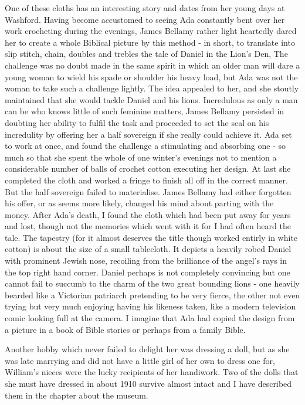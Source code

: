 One of these cloths has an interesting story and dates from her young days at Washford. Having become accustomed to seeing Ada constantly bent over her work crocheting during the evenings, James Bellamy rather light heartedly dared her to create a whole Biblical picture by this method - in short, to translate into slip stitch, chain, doubles and trebles the tale of Daniel in the Lion’s Den, The challenge was no doubt made in the same spirit in which an older man will dare a young woman to wield his spade or shoulder his heavy load, but Ada was not the woman to take such a challenge lightly. The idea appealed to her, and she stoutly maintained that she would tackle Daniel and his lions. Incredulous as only a man can be who knows little of such feminine matters, James Bellamy persisted in doubting her ability to fulfil the task and proceeded to set the seal on his incredulity by offering her a half sovereign if she really could achieve it. Ada set to work at once, and found the challenge a stimulating and absorbing one - so much so that she spent the whole of one winter's evenings not to mention a considerable number of balls of crochet cotton executing her design. At last she completed the cloth and worked a fringe to finish all off in the correct manner. But the half sovereign failed to materialise. James Bellamy had either forgotten his offer, or as seems more likely, changed his mind about parting with the money. After Ada's death, I found the cloth which had been put away for years and lost, though not the memories which went with it for I had often heard the tale. The tapestry (for it almost deserves the title though worked entirly in white cotton) is about the size of a small tablecloth. It depicts a heavily robed Daniel with prominent Jewish nose, recoiling from the brilliance of the angel's rays in the top right hand corner. Daniel perhaps is not completely convincing but one cannot fail to succumb to the charm of the two great bounding lions - one heavily bearded like a Victorian patriarch pretending to be very fierce, the other not even trying but very much enjoying having his likeness taken, like a modern television comic looking full at the camera. I imagine that Ada had copied the design from a picture in a book of Bible stories or perhaps from a family Bible.

Another hobby which never failed to delight her was dressing a doll, but as she was late marrying and did not have a little girl of her own to dress one for, William's nieces were the lucky recipients of her handiwork. Two of the dolls that she must have dressed in about 1910 survive almost intact and I have described them in the chapter about the museum.

